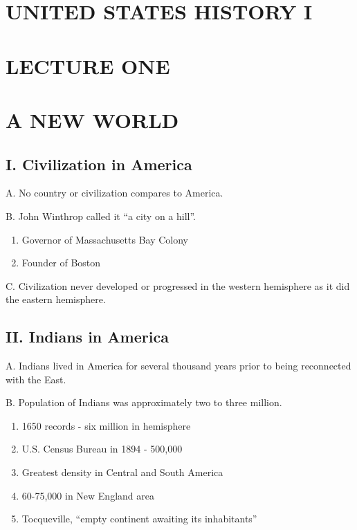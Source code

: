 \documentclass{article}
\begin{document}
\section*{UNITED STATES HISTORY I}

\section*{LECTURE ONE}

\section*{A NEW WORLD}

\subsection*{I. Civilization in America}

\noindent A. No country or civilization compares to America.

\noindent B. John Winthrop called it “a city on a hill”.

\begin{enumerate}
    \item Governor of Massachusetts Bay Colony
    \item Founder of Boston
\end{enumerate}

\noindent C. Civilization never developed or progressed in the western hemisphere as it did the eastern hemisphere.

\subsection*{II. Indians in America}

\noindent A. Indians lived in America for several thousand years prior to being reconnected with the East.

\noindent B. Population of Indians was approximately two to three million.

\begin{enumerate}
    \item 1650 records - six million in hemisphere
    \item U.S. Census Bureau in 1894 - 500,000
    \item Greatest density in Central and South America
    \item 60-75,000 in New England area
    \item Tocqueville, “empty continent awaiting its inhabitants”
\end{enumerate}
\end{document}
